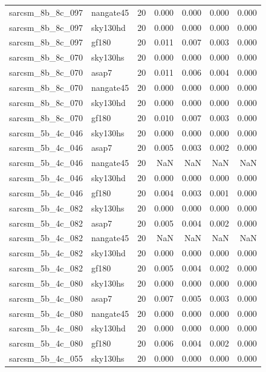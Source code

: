 \begin{tabular}{llrrrrr}
sarcsm\_8b\_8c\_097 & nangate45 & 20 & 0.000 & 0.000 & 0.000 & 0.000 \\
sarcsm\_8b\_8c\_097 & sky130hd & 20 & 0.000 & 0.000 & 0.000 & 0.000 \\
sarcsm\_8b\_8c\_097 & gf180 & 20 & 0.011 & 0.007 & 0.003 & 0.000 \\
sarcsm\_8b\_8c\_070 & sky130hs & 20 & 0.000 & 0.000 & 0.000 & 0.000 \\
sarcsm\_8b\_8c\_070 & asap7 & 20 & 0.011 & 0.006 & 0.004 & 0.000 \\
sarcsm\_8b\_8c\_070 & nangate45 & 20 & 0.000 & 0.000 & 0.000 & 0.000 \\
sarcsm\_8b\_8c\_070 & sky130hd & 20 & 0.000 & 0.000 & 0.000 & 0.000 \\
sarcsm\_8b\_8c\_070 & gf180 & 20 & 0.010 & 0.007 & 0.003 & 0.000 \\
sarcsm\_5b\_4c\_046 & sky130hs & 20 & 0.000 & 0.000 & 0.000 & 0.000 \\
sarcsm\_5b\_4c\_046 & asap7 & 20 & 0.005 & 0.003 & 0.002 & 0.000 \\
sarcsm\_5b\_4c\_046 & nangate45 & 20 & NaN & NaN & NaN & NaN \\
sarcsm\_5b\_4c\_046 & sky130hd & 20 & 0.000 & 0.000 & 0.000 & 0.000 \\
sarcsm\_5b\_4c\_046 & gf180 & 20 & 0.004 & 0.003 & 0.001 & 0.000 \\
sarcsm\_5b\_4c\_082 & sky130hs & 20 & 0.000 & 0.000 & 0.000 & 0.000 \\
sarcsm\_5b\_4c\_082 & asap7 & 20 & 0.005 & 0.004 & 0.002 & 0.000 \\
sarcsm\_5b\_4c\_082 & nangate45 & 20 & NaN & NaN & NaN & NaN \\
sarcsm\_5b\_4c\_082 & sky130hd & 20 & 0.000 & 0.000 & 0.000 & 0.000 \\
sarcsm\_5b\_4c\_082 & gf180 & 20 & 0.005 & 0.004 & 0.002 & 0.000 \\
sarcsm\_5b\_4c\_080 & sky130hs & 20 & 0.000 & 0.000 & 0.000 & 0.000 \\
sarcsm\_5b\_4c\_080 & asap7 & 20 & 0.007 & 0.005 & 0.003 & 0.000 \\
sarcsm\_5b\_4c\_080 & nangate45 & 20 & 0.000 & 0.000 & 0.000 & 0.000 \\
sarcsm\_5b\_4c\_080 & sky130hd & 20 & 0.000 & 0.000 & 0.000 & 0.000 \\
sarcsm\_5b\_4c\_080 & gf180 & 20 & 0.006 & 0.004 & 0.002 & 0.000 \\
sarcsm\_5b\_4c\_055 & sky130hs & 20 & 0.000 & 0.000 & 0.000 & 0.000 \\

\end{tabular}
